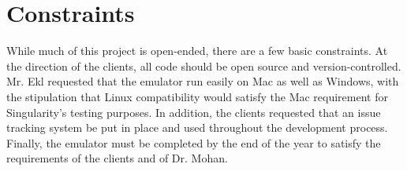 \documentclass[12pt]{article}
\begin{document}
\section{Constraints}
        While much of this project is open-ended, there are a few basic constraints. At the direction of the clients, all code should be open source and version-controlled. Mr. Ekl requested that the emulator run easily on Mac as well as Windows, with the stipulation that Linux compatibility would satisfy the Mac requirement for Singularity's testing purposes. In addition, the clients requested that an issue tracking system be put in place and used throughout the development process. Finally, the emulator must be completed by the end of the year to satisfy the requirements of the clients and of Dr. Mohan.
\end{document}
